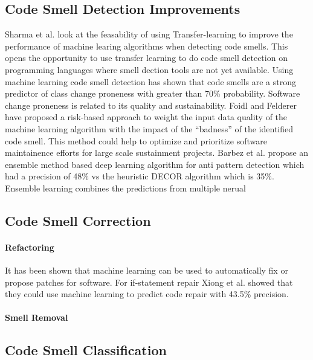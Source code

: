 \documentclass[conference]{IEEEtran}
\begin{document}
\subsection{Code Smell Detection Improvements}
Sharma et al.\cite{sharma_feasibility_2019} look at the feasability of using Transfer-learning to improve the performance of machine learing algorithms when detecting code smells. This opens the opportunity to use transfer learning to do code smell detection on programming languages where smell dection tools are not yet available.
Using machine learning code smell detection has shown that code smells are a strong predictor of class change proneness\cite{pritam_assessment_2019} with greater than 70\% probability. Software change proneness is related to its quality and sustainability.
Foidl and Felderer have proposed\cite{foidl_risk-based_2019} a risk-based approach to weight the input data quality of the machine learning algorithm with the impact of the ``badness'' of the identified code smell. 
This method could help to optimize and prioritize software maintainence efforts for large scale sustainment projects.
Barbez et al. propose\cite{barbez_machine-learning_2019} an ensemble method based deep learning algorithm for anti pattern detection which had a precision of 48\% vs the heuristic DECOR algorithm which is 35\%. Ensemble learning combines the predictions from multiple nerual

\subsection{Code Smell Correction}

\paragraph{Refactoring} It has been shown that machine learning can be used to automatically fix or propose patches for software\cite{xiong_learning_2018}. For if-statement repair Xiong et al. showed that they could use machine learning to predict code repair with 43.5\% precision.

\paragraph{Smell Removal}

\subsection{Code Smell Classification}
\end{document}
